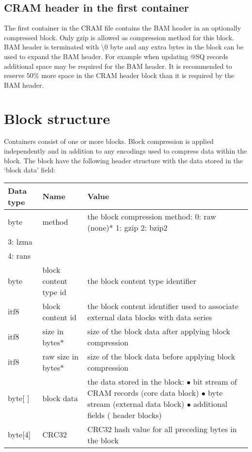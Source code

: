 \documentclass[a4paper]{article}
\begin{document}
\subsection{\textbf{CRAM header in the first container}}

The first container in the CRAM file contains the BAM header in an optionally
compressed block. Only gzip is allowed as compression method for this block. BAM
header is terminated with \textbackslash{}0 byte and any extra bytes in the
block can be used to expand the BAM header. For example when updating @SQ
records additional space may be required for the BAM header. It is recommended
to reserve 50\% more space in the CRAM header block than it is required by the
BAM header.

\section{\textbf{Block structure}}

Containers consist of one or more blocks. Block compression is applied independently 
and in addition to any encodings used to compress data within the block. The block 
have the following header structure with the data stored in the `block data' field:

\begin{tabular}{|l|>{\raggedright}p{120pt}|>{\raggedright}p{260pt}|}
\hline
\textbf{Data type} & \textbf{Name} & \textbf{Value}
\tabularnewline
\hline
byte & method & the block compression method: \linebreak{}
0: raw (none)*\linebreak{}
1: gzip\linebreak{}
2: bzip2\tabularnewline
3: lzma\tabularnewline
4: rans\tabularnewline
\hline
byte & block content type id & the block content type identifier\tabularnewline
\hline
itf8 & block content id & the block content identifier used to associate external 
data blocks with data series\tabularnewline
\hline
itf8 & size in bytes* & size of the block data after applying block compression\tabularnewline
\hline
itf8 & raw size in bytes* & size of the block data before applying block compression\tabularnewline
\hline
byte[ ] & block data & the data stored in the block:\linebreak{}
$\bullet$ bit stream of CRAM records (core data block)\linebreak{}
$\bullet$ byte stream (external data block)\linebreak{}
$\bullet$ additional fields ( header blocks)\tabularnewline
\hline
byte[4] & CRC32 & CRC32 hash value for all preceding bytes in the block\tabularnewline
\hline
\end{tabular}
\end{document}

